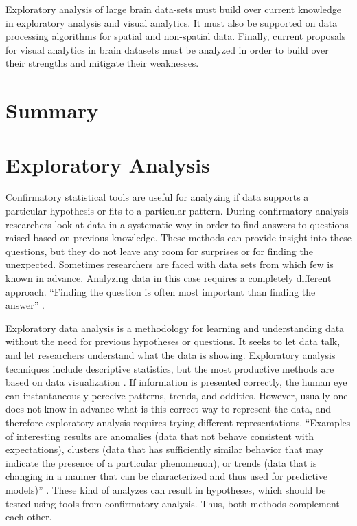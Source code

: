  
Exploratory analysis of large brain data-sets must build over current knowledge in exploratory analysis and visual analytics. It must also be supported on data processing algorithms for spatial and non-spatial data. Finally, current proposals for visual analytics in brain datasets must be analyzed in order to build over their strengths and mitigate their weaknesses.



\section{Summary}

\section{Exploratory Analysis}

%


Confirmatory statistical tools are useful for analyzing if data supports a particular hypothesis or fits to a particular pattern.  During confirmatory analysis researchers look at data in a systematic way in order to find answers to questions raised based on previous knowledge. These methods can provide insight into these questions, but they do not leave any room for surprises or for finding the unexpected. Sometimes researchers are faced with data sets from which few is known in advance. Analyzing data in this case requires a completely different approach. ``Finding the question is often most important than finding the answer'' \autocite{tukey_we_1980}.

Exploratory data analysis is a methodology for learning and understanding data without the need for previous hypotheses or questions. It seeks to let data talk, and let researchers understand what the data is showing. Exploratory analysis techniques include descriptive statistics, but the most productive methods are based on data visualization \autocite{tukey_exploratory_1977}. If information is presented correctly, the human eye can instantaneously perceive patterns, trends, and oddities. However, usually one does not know in advance what is this correct way to represent the data, and therefore exploratory analysis requires trying different representations. 
``Examples of interesting results are anomalies (data that not behave consistent with expectations), clusters (data that has sufficiently similar behavior that may indicate the presence of a particular phenomenon), or trends (data that is changing in a manner that can be characterized and thus used for predictive models)'' \autocite{ward_interactive_2010}.
These kind of analyzes can result in hypotheses, which should be tested using tools from confirmatory analysis. Thus, both methods complement each other.

